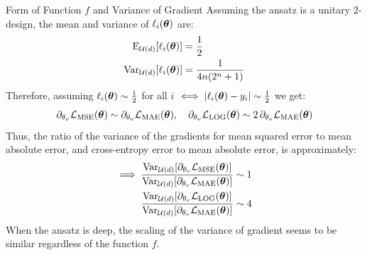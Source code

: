 \documentclass[dvipdfmx,10pt,aspectratio=169]{beamer}
\begin{document}
\begin{frame}{Form of Function $f$ and Variance of Gradient}
    Assuming the ansatz is a unitary $2$-design, the mean and variance of $\ell_i(\vb*{\theta})$ are:
    \begin{align*}
        \operatorname{E}_{\mathcal{U}(d)}[\ell_i(\vb*{\theta})]  &= \frac12\\
        \operatorname{Var}_{\mathcal{U}(d)}[\ell_i(\vb*{\theta})]&= \frac{1}{4n(2^n+1)}
    \end{align*}
    Therefore, assuming $\ell_i(\vb*{\theta}) \sim \frac12$ for all $i$ $\iff |\ell_i(\vb*{\theta}) - y_i| \sim \frac12$ we get:
    \begin{align*}
        \partial_{\theta_\nu} \mathcal{L}_{\mathrm{MSE}}(\vb*{\theta}) \sim \partial_{\theta_\nu} \mathcal{L}_{\mathrm{MAE}}(\vb*{\theta}),\quad
        \partial_{\theta_\nu} \mathcal{L}_{\mathrm{LOG}}(\vb*{\theta}) \sim 2\,\partial_{\theta_\nu} \mathcal{L}_{\mathrm{MAE}}(\vb*{\theta})
    \end{align*}
    Thus, the ratio of the variance of the gradients for mean squared error to mean absolute error, and cross-entropy error to mean absolute error, is approximately:
    \begin{align*}
        \implies
        \frac{\operatorname{Var}_{\mathcal{U}(d)}[\partial_{\theta_\nu}\mathcal{L}_{\mathrm{MSE}}(\vb*{\theta})]}{\operatorname{Var}_{\mathcal{U}(d)}[\partial_{\theta_\nu}\mathcal{L}_{\mathrm{MAE}}(\vb*{\theta})]} &\sim 1\\
        \frac{\operatorname{Var}_{\mathcal{U}(d)}[\partial_{\theta_\nu}\mathcal{L}_{\mathrm{LOG}}(\vb*{\theta})]}{\operatorname{Var}_{\mathcal{U}(d)}[\partial_{\theta_\nu}\mathcal{L}_{\mathrm{MAE}}(\vb*{\theta})]} &\sim 4
    \end{align*}
    When the ansatz is deep, the scaling of the variance of gradient seems to be similar regardless of the function $f$.
\end{frame}
\end{document}
